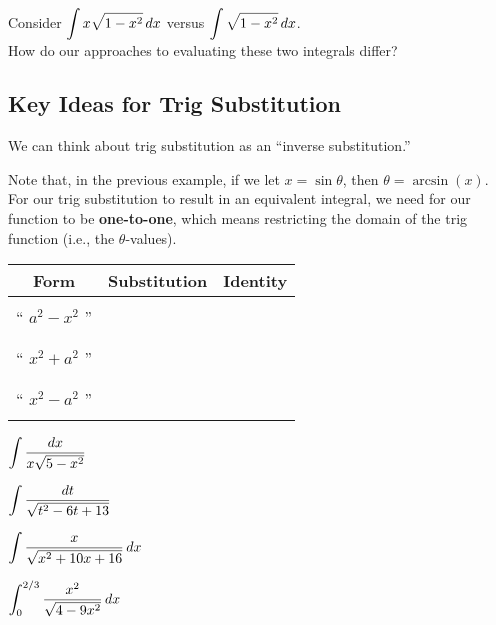 \documentclass[12pt]{article}
\begin{document}
\newpage

\Example Consider $\displaystyle\int x\sqrt{1-x^2}\,dx$ versus $\displaystyle\int\sqrt{1-x^2}\,dx$. \\

How do our approaches to evaluating these two integrals differ?

\vfill

\subsection*{Key Ideas for Trig Substitution}

We can think about trig substitution as an ``inverse substitution.''

\vspace{15mm}

Note that, in the previous example, if we let $x=\sin\theta$, then $\theta=\arcsin(x)$. For our trig substitution to result in an equivalent integral, we need for our function to be \textbf{one-to-one}, which means restricting the domain of the trig function (i.e., the $\theta$-values).

\begin{center}
\renewcommand{\arraystretch}{1.7}
\begin{tabular}{|c|c|c|}
\hline
\textbf{Form} & \textbf{Substitution} & \textbf{Identity}\\
\hline
& & \\
`` $a^2-x^2$ '' & \hspace{60mm} & \hspace{60mm} \\
& & \\
\hline
& & \\
`` $x^2+a^2$ '' & & \\
& & \\
\hline
& & \\
`` $x^2-a^2$ '' & & \\
& & \\
\hline
\end{tabular}
\end{center}

\newpage

\Example $\displaystyle\int\frac{dx}{x\sqrt{5-x^2}}$

\newpage

\Example $\displaystyle\int\frac{dt}{\sqrt{t^2-6t+13}}$

\newpage

\Example $\displaystyle\int\frac{x}{\sqrt{x^2+10x+16}}\,dx$

\newpage

\Example $\displaystyle\int_0^{2/3}\frac{x^2}{\sqrt{4-9x^2}}\,dx$
\end{document}
